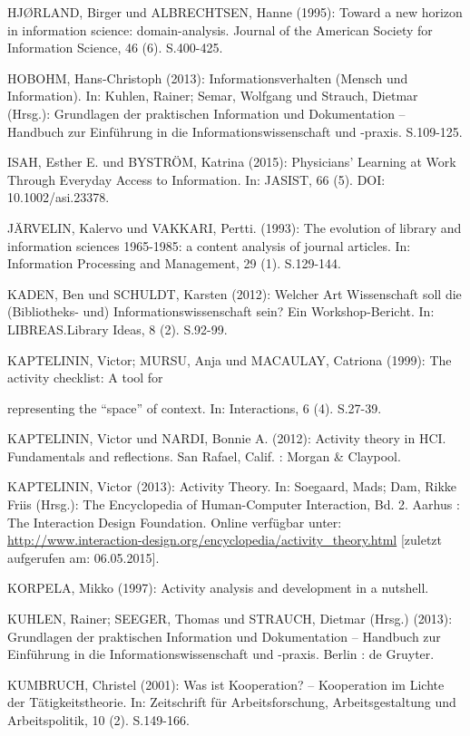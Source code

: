 \documentclass[a4paper,
fontsize=11pt,
oneside,
numbers=noperiodatend,
parskip=half-,
bibliography=totoc,
final
]{scrartcl}
\begin{document}
HJØRLAND, Birger und ALBRECHTSEN, Hanne (1995): Toward a new horizon in
information science: domain-analysis. Journal of the American Society
for Information Science, 46 (6). S.400-425.

HOBOHM, Hans-Christoph (2013): Informationsverhalten (Mensch und
Information). In: Kuhlen, Rainer; Semar, Wolfgang und Strauch, Dietmar
(Hrsg.): Grundlagen der praktischen Information und Dokumentation --
Handbuch zur Einführung in die Informationswissenschaft und -praxis.
S.109-125.

ISAH, Esther E. und BYSTRÖM, Katrina (2015): Physicians' Learning at
Work Through Everyday Access to Information. In: JASIST, 66 (5). DOI:
10.1002/asi.23378.

JÄRVELIN, Kalervo und VAKKARI, Pertti. (1993): The evolution of library
and information sciences 1965-1985: a content analysis of journal
articles. In: Information Processing and Management, 29 (1). S.129-144.

KADEN, Ben und SCHULDT, Karsten (2012): Welcher Art Wissenschaft soll
die (Bibliotheks- und) Informationswissenschaft sein? Ein
Workshop-Bericht. In: LIBREAS.Library Ideas, 8 (2). S.92-99.

KAPTELININ, Victor; MURSU, Anja und MACAULAY, Catriona (1999): The
activity checklist: A tool for

representing the \enquote{space} of context. In: Interactions, 6 (4).
S.27-39.

KAPTELININ, Victor und NARDI, Bonnie A. (2012): Activity theory in HCI.
Fundamentals and reflections. San Rafael, Calif. : Morgan \& Claypool.

KAPTELININ, Victor (2013): Activity Theory. In: Soegaard, Mads; Dam,
Rikke Friis (Hrsg.): The Encyclopedia of Human-Computer Interaction, Bd.
2. Aarhus : The Interaction Design Foundation. Online verfügbar unter:
\url{http://www.interaction-design.org/encyclopedia/activity_theory.html}
{[}zuletzt aufgerufen am: 06.05.2015{]}.

KORPELA, Mikko (1997): Activity analysis and development in a nutshell.

KUHLEN, Rainer; SEEGER, Thomas und STRAUCH, Dietmar (Hrsg.) (2013):
Grundlagen der praktischen Information und Dokumentation -- Handbuch zur
Einführung in die Informationswissenschaft und -praxis. Berlin : de
Gruyter.

KUMBRUCH, Christel (2001): Was ist Kooperation? -- Kooperation im Lichte
der Tätigkeitstheorie. In: Zeitschrift für Arbeitsforschung,
Arbeitsgestaltung und Arbeitspolitik, 10 (2). S.149-166.
\end{document}

